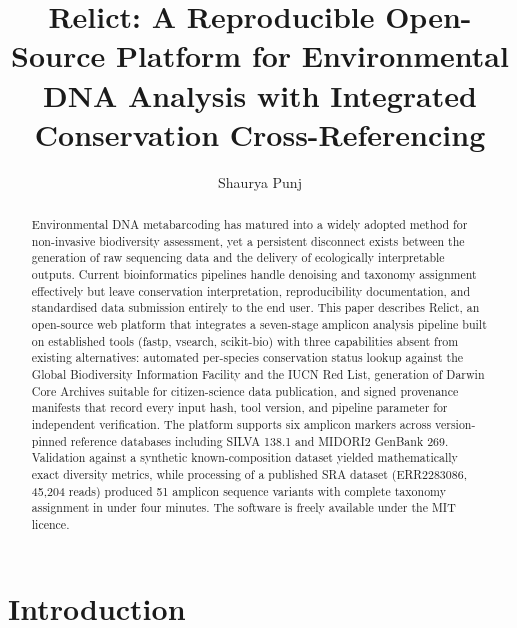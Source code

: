 \documentclass[runningheads]{llncs}
\begin{document}
\title{Relict: A Reproducible Open-Source Platform for Environmental DNA Analysis with Integrated Conservation Cross-Referencing}

\author{Shaurya Punj}


\maketitle

\begin{abstract}
Environmental DNA metabarcoding has matured into a widely adopted method for non-invasive biodiversity assessment, yet a persistent disconnect exists between the generation of raw sequencing data and the delivery of ecologically interpretable outputs. Current bioinformatics pipelines handle denoising and taxonomy assignment effectively but leave conservation interpretation, reproducibility documentation, and standardised data submission entirely to the end user. This paper describes Relict, an open-source web platform that integrates a seven-stage amplicon analysis pipeline built on established tools (fastp, vsearch, scikit-bio) with three capabilities absent from existing alternatives: automated per-species conservation status lookup against the Global Biodiversity Information Facility and the IUCN Red List, generation of Darwin Core Archives suitable for citizen-science data publication, and signed provenance manifests that record every input hash, tool version, and pipeline parameter for independent verification. The platform supports six amplicon markers across version-pinned reference databases including SILVA 138.1 and MIDORI2 GenBank 269. Validation against a synthetic known-composition dataset yielded mathematically exact diversity metrics, while processing of a published SRA dataset (ERR2283086, 45,204 reads) produced 51 amplicon sequence variants with complete taxonomy assignment in under four minutes. The software is freely available under the MIT licence.

\end{abstract}

\section{Introduction}
\end{document}

